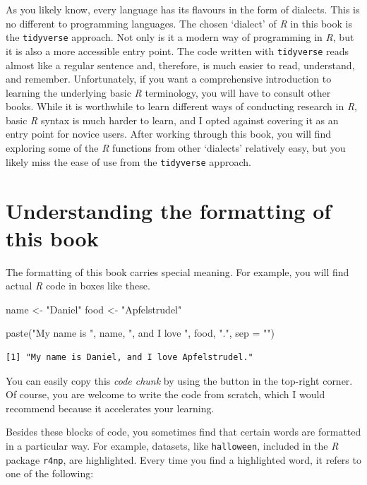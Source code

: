 \documentclass[
  letterpaper,
]{krantz}
\makeatletter
\newenvironment{Shaded}{\begin{snugshade}}{\end{snugshade}}
\newcommand{\AttributeTok}[1]{\textcolor[rgb]{0.40,0.45,0.13}{#1}}
\newcommand{\FunctionTok}[1]{\textcolor[rgb]{0.28,0.35,0.67}{#1}}
\newcommand{\NormalTok}[1]{\textcolor[rgb]{0.00,0.23,0.31}{#1}}
\newcommand{\OtherTok}[1]{\textcolor[rgb]{0.00,0.23,0.31}{#1}}
\newcommand{\StringTok}[1]{\textcolor[rgb]{0.13,0.47,0.30}{#1}}
\newenvironment{kframe}{%
\medskip{}
\setlength{\fboxsep}{.8em}
 \def\at@end@of@kframe{}%
 \ifinner\ifhmode%
  \def\at@end@of@kframe{\end{minipage}}%
  \begin{minipage}{\columnwidth}%
 \fi\fi%
 \def\FrameCommand##1{\hskip\@totalleftmargin \hskip-\fboxsep
 \colorbox{shadecolor}{##1}\hskip-\fboxsep
     \hskip-\linewidth \hskip-\@totalleftmargin \hskip\columnwidth}%
 \MakeFramed {\advance\hsize-\width
   \@totalleftmargin\z@ \linewidth\hsize
   \@setminipage}}%
 {\par\unskip\endMakeFramed%
 \at@end@of@kframe}
\renewenvironment{Shaded}{\begin{kframe}}{\end{kframe}}
\makeatother
\begin{document}
As you likely know, every language has its flavours in the form of
dialects. This is no different to programming languages. The chosen
`dialect' of \emph{R} in this book is the \texttt{tidyverse} approach.
Not only is it a modern way of programming in \emph{R}, but it is also a
more accessible entry point. The code written with \texttt{tidyverse}
reads almost like a regular sentence and, therefore, is much easier to
read, understand, and remember. Unfortunately, if you want a
comprehensive introduction to learning the underlying basic \emph{R}
terminology, you will have to consult other books. While it is
worthwhile to learn different ways of conducting research in \emph{R},
basic \emph{R} syntax is much harder to learn, and I opted against
covering it as an entry point for novice users. After working through
this book, you will find exploring some of the \emph{R} functions from
other `dialects' relatively easy, but you likely miss the ease of use
from the \texttt{tidyverse} approach.

\section{Understanding the formatting of this
book}\label{sec-formatting-of-this-book}

The formatting of this book carries special meaning. For example, you
will find actual \emph{R} code in boxes like these.

\begin{Shaded}
\begin{Highlighting}[]
\NormalTok{name }\OtherTok{\textless{}{-}} \StringTok{"Daniel"}
\NormalTok{food }\OtherTok{\textless{}{-}} \StringTok{"Apfelstrudel"}

\FunctionTok{paste}\NormalTok{(}\StringTok{"My name is "}\NormalTok{, name, }\StringTok{", and I love "}\NormalTok{, food, }\StringTok{"."}\NormalTok{, }\AttributeTok{sep =} \StringTok{""}\NormalTok{)}
\end{Highlighting}
\end{Shaded}

\begin{verbatim}
[1] "My name is Daniel, and I love Apfelstrudel."
\end{verbatim}

You can easily copy this \emph{code chunk} by using the button in the
top-right corner. Of course, you are welcome to write the code from
scratch, which I would recommend because it accelerates your learning.

Besides these blocks of code, you sometimes find that certain words are
formatted in a particular way. For example, datasets, like
\texttt{halloween}, included in the \emph{R} package \texttt{r4np}, are
highlighted. Every time you find a highlighted word, it refers to one of
the following:
\end{document}

